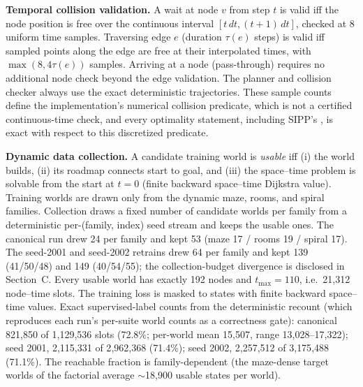 \documentclass[letterpaper]{article} %
\begin{document}
\begin{table}[t]
\label{tab:archspec}
\end{table}

\textbf{Temporal collision validation.} A wait at node $v$ from step $t$ is valid iff the node position is free over the continuous interval $[t\,dt, (t{+}1)\,dt]$, checked at 8 uniform time samples. Traversing edge $e$ (duration $\tau(e)$ steps) is valid iff sampled points along the edge are free at their interpolated times, with $\max(8, 4\tau(e))$ samples. Arriving at a node (pass-through) requires no additional node check beyond the edge validation. The planner and collision checker always use the exact deterministic trajectories. These sample counts define the implementation's numerical collision predicate, which is not a certified continuous-time check, and every optimality statement, including SIPP's \citep{phillips2011sipp}, is exact with respect to this discretized predicate.

\textbf{Dynamic data collection.} A candidate training world is \emph{usable} iff (i) the world builds, (ii) its roadmap connects start to goal, and (iii) the space--time problem is solvable from the start at $t{=}0$ (finite backward space--time Dijkstra value). Training worlds are drawn only from the dynamic maze, rooms, and spiral families. Collection draws a fixed number of candidate worlds per family from a deterministic per-(family, index) seed stream and keeps the usable ones. The canonical run drew 24 per family and kept 53 (maze 17 / rooms 19 / spiral 17). The seed-2001 and seed-2002 retrains drew 64 per family and kept 139 (41/50/48) and 149 (40/54/55); the collection-budget divergence is disclosed in Section~C. Every usable world has exactly 192 nodes and $t_{\max}{=}110$, i.e.\ 21{,}312 node--time slots. The training loss is masked to states with finite backward space--time values. Exact supervised-label counts from the deterministic recount (which reproduces each run's per-suite world counts as a correctness gate): canonical 821{,}850 of 1{,}129{,}536 slots (72.8\%; per-world mean 15{,}507, range 13{,}028--17{,}322); seed 2001, 2{,}115{,}331 of 2{,}962{,}368 (71.4\%); seed 2002, 2{,}257{,}512 of 3{,}175{,}488 (71.1\%). The reachable fraction is family-dependent (the maze-dense target worlds of the factorial average $\sim$18{,}900 usable states per world).
\end{document}
